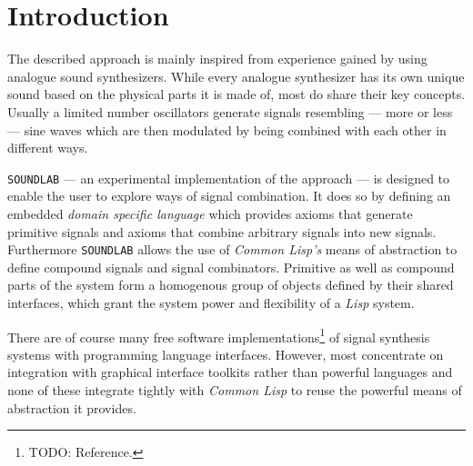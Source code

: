 \section{Introduction}

The described approach is mainly inspired from experience gained by using
analogue sound synthesizers. While every analogue synthesizer has its own
unique sound based on the physical parts it is made of, most do share
their key concepts. Usually a limited number oscillators generate signals
resembling --- more or less --- sine waves which are then modulated by
being combined with each other in different ways.

\texttt{SOUNDLAB} --- an experimental implementation of the approach ---
is designed to enable the user to explore ways of signal combination. It
does so by defining an embedded \textit{domain specific language} which
provides axioms that generate primitive signals and axioms that combine
arbitrary signals into new signals. Furthermore \texttt{SOUNDLAB} allows
the use of \textit{Common Lisp's} means of abstraction to define compound
signals and signal combinators. Primitive as well as compound parts of the
system form a homogenous group of objects defined by their shared
interfaces, which grant the system power and flexibility of a
\textit{Lisp} system.

There are of course many free software implementations\footnote{TODO:
Reference.} of signal synthesis systems with programming language 
interfaces. However, most concentrate on integration with graphical
interface toolkits rather than powerful languages and none of these
integrate tightly with \textit{Common Lisp} to reuse the powerful means of
abstraction it provides.
